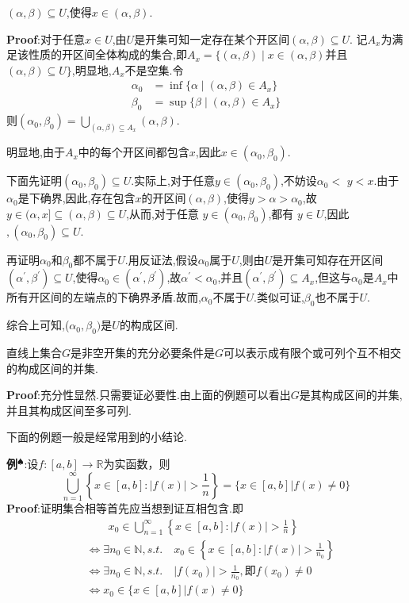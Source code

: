 $(\alpha,\beta)\subseteq U$,使得$x\in(\alpha,\beta).$\par
\textbf{Proof}:对于任意$x\in U$,由$U$是开集可知一定存在某个开区间$(\alpha,\beta)\subseteq U.$ 记$A_x$为满足该性质的开区间全体构成的集合,即$A_x=\{(\alpha,\beta)\mid x\in(\alpha,\beta)$并且$(\alpha,\beta)\subseteq U\}$,明显地,$A_x$不是空集.令
$$
\begin{aligned}
    \alpha_0 &=\inf\{\alpha\mid(\alpha,\beta)\in A_x\}\\
    \beta_0  &=\sup\{\beta\mid(\alpha,\beta)\in A_x\}
\end{aligned}
$$
则$(\alpha_{0},\beta_{0})=\bigcup_{(\alpha,\beta)\subseteq A_{x}}(\alpha,\beta).$\par
明显地,由于$A_x$中的每个开区间都包含$x$,因此$x\in(\alpha_0,\beta_0).$\par
下面先证明$(\alpha_0,\beta_0)\subseteq U$.实际上,对于任意$y\in(\alpha_0,\beta_0)$,不妨设$\alpha_0<$ $y<x.$由于$\alpha_0$是下确界,因此,存在包含$x$的开区间$(\alpha,\beta)$,使得$y>\alpha>\alpha_0$,故$y\in(\alpha,x]\subseteq(\alpha,\beta)\subseteq U$,从而,对于任意 $y\in(\alpha_0,\beta_0)$,都有 $y\in U$,因此$,(\alpha_0,\beta_0)\subseteq U.$\par
再证明$\alpha_0$和$\beta_0$都不属于$U$.用反证法,假设$\alpha_0$属于$U$,则由$U$是开集可知存在开区间$(\alpha^\prime,\beta^{\prime})\subseteq U$,使得$\alpha_0\in(\alpha^\prime,\beta^\prime)$,故$\alpha^\prime<\alpha_0$,并且$(\alpha^\prime,\beta^\prime)\subseteq A_x$,但这与$\alpha_0$是$A_x$中所有开区间的左端点的下确界矛盾.故而,$\alpha_0$不属于$U$.类似可证,$\beta_0$也不属于$U$.\par
综合上可知,($\alpha_0,\beta_0)$是$U$的构成区间.
\begin{tcolorbox}[colback=KuangNei,colframe=BianKuang,title=\textbf{直线上开集的构造},sharpish corners]
    直线上集合$G$是非空开集的充分必要条件是$G$可以表示成有限个或可列个互不相交的构成区间的并集.
\end{tcolorbox}
\textbf{Proof}:充分性显然.只需要证必要性.由上面的例题可以看出$G$是其构成区间的并集,并且其构成区间至多可列.\par
下面的例题一般是经常用到的小结论.\par
\textbf{例}$^\spadesuit $:设$f:[a,b]\to\mathbb{R}$为实函数，则
$$
\bigcup_{n=1}^{\infty}\left\{x\in[a,b]:|f(x)|>\frac{1}{n}\right\}=\{x\in[a,b] |f(x)\neq 0\}
$$
\qquad \textbf{Proof}:证明集合相等首先应当想到证互相包含.即
$$
\begin{aligned}
    &\qquad x_0\in\bigcup_{n=1}^{\infty}\left\{x\in[a,b]:|f(x)|>\frac{1}{n}\right\}\\
    &\Leftrightarrow\exists n_0\in\mathbb{N},s.t.\quad x_0\in\left\{x\in[a,b] :|f(x)|>\frac{1}{n_0}\right\}\\
    &\Leftrightarrow\exists n_0\in\mathbb{N},s.t.\quad |f(x_0)|>\frac{1}{n_0},\text{即}f(x_0)\neq 0\\
    &\Leftrightarrow x_0\in\{x\in[a,b]|f(x)\neq 0\}
\end{aligned}
$$
